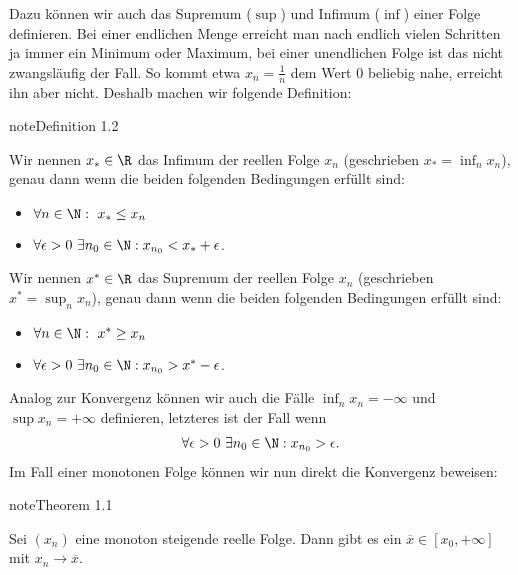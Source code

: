 \documentclass[letterpaper,10pt,english]{jupyterBook}
\begin{document}
Dazu können wir auch das Supremum (\(\sup\)) und Infimum (\(\inf\)) einer Folge definieren. Bei einer endlichen Menge erreicht man nach endlich vielen Schritten ja immer ein Minimum oder Maximum, bei einer unendlichen Folge ist das nicht zwangsläufig der Fall. So kommt etwa \(x_n = \frac{1}n\) dem Wert \(0\) beliebig nahe, erreicht ihn aber nicht. Deshalb machen wir folgende Definition:
\label{vorkurs/folgen:definition-7}
\begin{sphinxadmonition}{note}{Definition 1.2}



Wir nennen \(x_* \in \R\) das Infimum der reellen Folge \(x_n\) (geschrieben \(x_* = \inf_n x_n\)), genau dann wenn die beiden folgenden Bedingungen erfüllt sind:
\begin{itemize}
\item {} 
\(\forall n \in \N:~x_* \leq x_n\)

\item {} 
\(\forall \epsilon > 0~\exists n_0 \in \N: x_{n_0} < x_* + \epsilon\).

\end{itemize}

Wir nennen \(x^* \in \R\) das Supremum der reellen Folge \(x_n\) (geschrieben \(x^* = \sup_n x_n\)), genau dann wenn die beiden folgenden Bedingungen erfüllt sind:
\begin{itemize}
\item {} 
\(\forall n \in \N:~x^* \geq x_n\)

\item {} 
\(\forall \epsilon > 0~\exists n_0 \in \N: x_{n_0} > x^* -\epsilon\).

\end{itemize}
\end{sphinxadmonition}

Analog zur Konvergenz können wir auch die Fälle \(\inf_n x_n = - \infty\) und \(\sup x_n = +\infty\) definieren, letzteres ist der Fall wenn
\begin{equation*}
\begin{split} \forall \epsilon > 0~\exists n_0 \in \N: x_{n_0} > \epsilon . \end{split}
\end{equation*}
Im Fall einer monotonen Folge können wir nun direkt die Konvergenz beweisen:
\label{vorkurs/folgen:theorem-8}
\begin{sphinxadmonition}{note}{Theorem 1.1}



Sei \((x_n)\) eine monoton steigende reelle Folge. Dann gibt es ein \(\overline{x} \in [x_0,+\infty]\) mit \(x_n \rightarrow \overline{x}\).
\end{sphinxadmonition}
\end{document}

